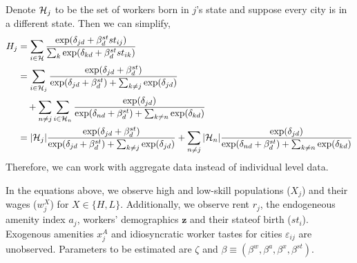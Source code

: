 \documentclass{article}
\begin{document}
Denote $\mathcal{H}_j$ to be the set of workers born in $j$'s state and suppose every city is in a different state. Then we can simplify,
\begin{align*}
H_{j} &= \sum_{i\in\mathcal{H}} \frac{\exp(\delta_{jd} + \beta_d^{st}st_{ij})}{\sum_{k} \exp(\delta_{kd} + \beta_d^{st}st_{ik})} \\
&= \sum_{i\in\mathcal{H}_j} \frac{\exp(\delta_{jd} + \beta_d^{st})}{\exp(\delta_{jd} + \beta_d^{st}) + \sum_{k\neq j} \exp(\delta_{jd})} \\
&\quad+ \sum_{n\neq j}\sum_{i\in \mathcal{H}_n} \frac{\exp(\delta_{jd})}{\exp(\delta_{nd} + \beta_d^{st})+\sum_{k\neq n} \exp(\delta_{kd})} \\
&= |\mathcal{H}_j|\frac{\exp(\delta_{jd} + \beta_d^{st})}{\exp(\delta_{jd} + \beta_d^{st}) + \sum_{k\neq j} \exp(\delta_{jd})} + \sum_{n\neq j} |\mathcal{H}_n| \frac{\exp(\delta_{jd})}{\exp(\delta_{nd} + \beta_d^{st})+\sum_{k\neq n} \exp(\delta_{kd})} 
\end{align*}
Therefore, we can work with aggregate data instead of individual level data.

In the equations above, we observe high and low-skill populations ($X_{j}$) and their wages ($w_{j}^X$) for $X \in \{H, L\}$. Additionally, we observe rent $r_{j}$, the endogeneous amenity index $a_{j}$, workers' demographics $\bm{z}$ and their stateof birth ($st_i$). Exogenous amenities $x_{j}^A$ and idiosyncratic worker tastes for cities $\varepsilon_{ij}$ are unobserved. Parameters to be estimated are $\zeta$ and $\beta \equiv (\beta^w, \beta^a, \beta^x, \beta^{st})$.
\end{document}

